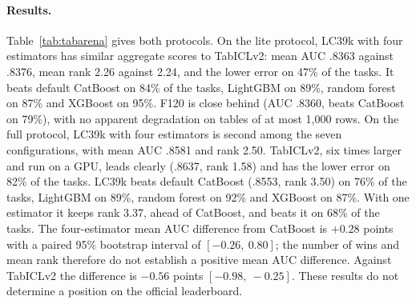 \documentclass[11pt]{article}
\begin{document}
\paragraph{Results.} Table~\ref{tab:tabarena} gives both protocols. On the lite protocol, LC39k with four
estimators has similar aggregate scores to TabICLv2: mean AUC .8363 against .8376, mean rank 2.26 against 2.24, and the lower error
on 47\% of the tasks. It beats default CatBoost on 84\% of the tasks, LightGBM on 89\%, random forest on 87\% and
XGBoost on 95\%. F120 is close behind (AUC .8360, beats CatBoost on 79\%), with no apparent degradation on
tables of at most 1,000 rows. On the full protocol, LC39k with four estimators is second among the seven configurations,
with mean AUC .8581 and rank 2.50. TabICLv2, six times larger and run on a GPU, leads clearly (.8637, rank 1.58)
and has the lower error on 82\% of the tasks. LC39k beats default CatBoost (.8553, rank 3.50) on 76\% of the tasks,
LightGBM on 89\%, random forest on 92\% and XGBoost on 87\%. With one estimator it keeps rank 3.37, ahead of
CatBoost, and beats it on 68\% of the tasks. The four-estimator mean AUC difference from CatBoost is
$+0.28$ points with a paired 95\% bootstrap interval of $[-0.26,\ 0.80]$; the number of wins and mean rank
therefore do not establish a positive mean AUC difference. Against TabICLv2 the difference is
$-0.56$ points $[-0.98,\ -0.25]$. These results do not determine a position on the official leaderboard.
\end{document}
